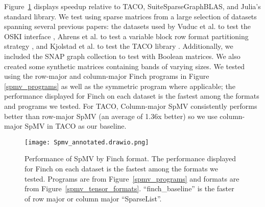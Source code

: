   Figure~\ref{fig:spmv_grouped} displays speedup relative to TACO, SuiteSparseGraphBLAS, and Julia’s standard library.  We test using sparse matrices from a large selection of datasets spanning several previous papers: the datasets used by Vuduc et al. to test the OSKI interface \cite{vuduc_oski:_2005}, Ahrens et al. to test a variable block row format partitioning strategy \cite{ahrens_optimal_2021}, and Kjolstad et al. to test the TACO library \cite{kjolstad_tensor_2017}. Additionally, we included the SNAP graph collection to test with Boolean matrices. We also created some synthetic matrices containing bands of varying sizes.
  We tested using the row-major and column-major Finch programs in Figure \ref{spmv_programs} as well as the symmetric program where applicable; the performance displayed for Finch on each dataset is the fastest among the formats and programs we tested. For TACO, Column-major SpMV consistently performs better than row-major SpMV (an average of 1.36x better) so we use column-major SpMV in TACO as our baseline.
   
  \begin{figure}[!h]
    \texttt{[image: Spmv\_annotated.drawio.png]}
    \caption{\footnotesize Performance of SpMV by Finch format. The performance displayed for Finch on each dataset is the fastest among the formats we tested. Programs are from Figure~\ref{spmv_programs} and formats are from Figure~\ref{spmv_tensor_formats}. ``finch\_baseline'' is the faster of row major or column major ``SparseList''.}
    \label{fig:spmv_grouped}
  \end{figure} 

